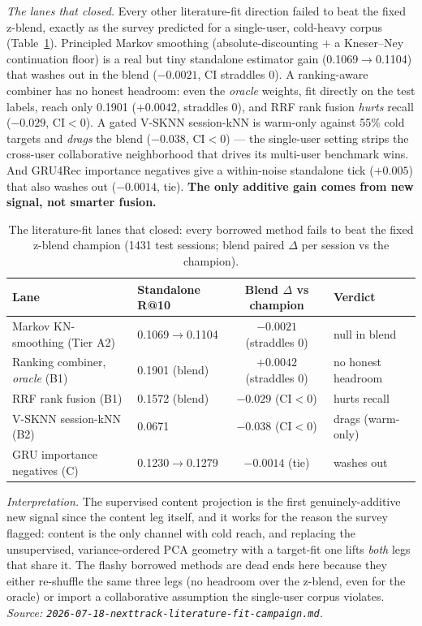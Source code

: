 \documentclass[11pt]{article}
\begin{document}
\emph{The lanes that closed.} Every other literature-fit direction failed to beat
the fixed z-blend, exactly as the survey predicted for a single-user, cold-heavy
corpus (Table~\ref{tab:nexttrack-projection-lanes}). Principled Markov smoothing
(absolute-discounting $+$ a Kneser--Ney continuation floor) is a real but tiny
standalone estimator gain (\num{0.1069}$\to$\num{0.1104}) that washes out in the
blend ($-\num{0.0021}$, CI straddles 0). A ranking-aware combiner has no honest
headroom: even the \emph{oracle} weights, fit directly on the test labels, reach
only \num{0.1901} ($+\num{0.0042}$, straddles 0), and RRF rank fusion \emph{hurts}
recall ($-\num{0.029}$, CI$<$0). A gated V-SKNN session-kNN is warm-only against
55\% cold targets and \emph{drags} the blend ($-\num{0.038}$, CI$<$0) --- the
single-user setting strips the cross-user collaborative neighborhood that drives
its multi-user benchmark wins. And GRU4Rec importance negatives give a within-noise
standalone tick ($+\num{0.005}$) that also washes out ($-\num{0.0014}$, tie).
\textbf{The only additive gain comes from new signal, not smarter fusion.}

\begin{table}[ht]
  \centering
  \caption{The literature-fit lanes that closed: every borrowed method fails to
  beat the fixed z-blend champion (\num{1431} test sessions; blend paired $\Delta$
  per session vs the champion).}
  \label{tab:nexttrack-projection-lanes}
  {\footnotesize\setlength{\tabcolsep}{5pt}\begin{tabular}{llcl}
    \toprule
    Lane & Standalone R@10 & Blend $\Delta$ vs champion & Verdict \\
    \midrule
    Markov KN-smoothing (Tier A2)         & 0.1069$\to$0.1104 & $-0.0021$ (straddles 0) & null in blend \\
    Ranking combiner, \emph{oracle} (B1)  & 0.1901 (blend) & $+0.0042$ (straddles 0) & no honest headroom \\
    RRF rank fusion (B1)                   & 0.1572 (blend) & $-0.029$ (CI$<$0) & hurts recall \\
    V-SKNN session-kNN (B2)                & 0.0671 & $-0.038$ (CI$<$0) & drags (warm-only) \\
    GRU importance negatives (C)           & 0.1230$\to$0.1279 & $-0.0014$ (tie) & washes out \\
    \bottomrule
  \end{tabular}}
\end{table}

\emph{Interpretation.} The supervised content projection is the first
genuinely-additive new signal since the content leg itself, and it works for the
reason the survey flagged: content is the only channel with cold reach, and
replacing the unsupervised, variance-ordered PCA geometry with a target-fit one
lifts \emph{both} legs that share it. The flashy borrowed methods are dead ends
here because they either re-shuffle the same three legs (no headroom over the
z-blend, even for the oracle) or import a collaborative assumption the single-user
corpus violates.
\emph{Source: \texttt{2026-07-18-nexttrack-literature-fit-campaign.md}.}
\end{document}
